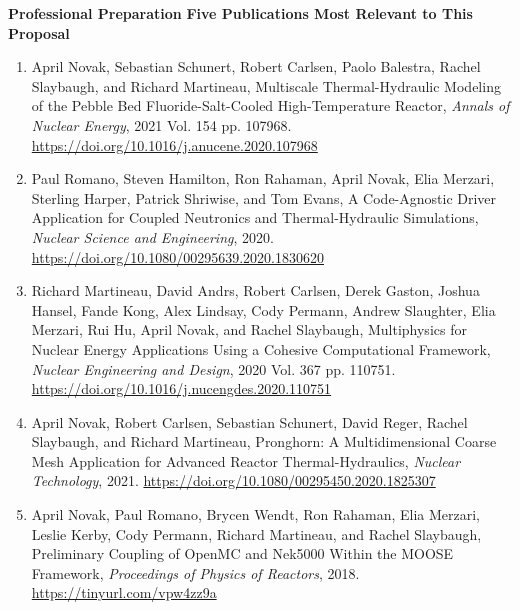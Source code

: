 \documentclass[11pt,letterpaper,english]{article}
\begin{document}
\begin{flushleft} {\bf Professional Preparation}
\vspace{.04in}
{\bf Five Publications Most Relevant to This Proposal}
\vspace{-6pt}
\begin{enumerate} \itemsep1pt \parskip0pt 
\item April Novak, Sebastian Schunert, Robert Carlsen, Paolo Balestra, Rachel Slaybaugh, and Richard Martineau, Multiscale Thermal-Hydraulic Modeling of the Pebble Bed Fluoride-Salt-Cooled High-Temperature Reactor, \textit{Annals of Nuclear Energy}, 2021 Vol. 154 pp. 107968. \url{https://doi.org/10.1016/j.anucene.2020.107968}
\item Paul Romano, Steven Hamilton, Ron Rahaman, April Novak, Elia Merzari, Sterling Harper, Patrick Shriwise, and Tom Evans, A Code-Agnostic Driver Application for Coupled Neutronics and Thermal-Hydraulic Simulations, \textit{Nuclear Science and Engineering}, 2020. \url{https://doi.org/10.1080/00295639.2020.1830620}
\item Richard Martineau, David Andrs, Robert Carlsen, Derek Gaston, Joshua Hansel, Fande Kong, Alex Lindsay, Cody Permann, Andrew Slaughter, Elia Merzari, Rui Hu, April Novak, and Rachel Slaybaugh, Multiphysics for Nuclear Energy Applications Using a Cohesive Computational Framework, \textit{Nuclear Engineering and Design}, 2020 Vol. 367 pp. 110751. \url{https://doi.org/10.1016/j.nucengdes.2020.110751}\\
\item April Novak, Robert Carlsen, Sebastian Schunert, David Reger, Rachel Slaybaugh, and Richard Martineau, Pronghorn: A Multidimensional Coarse Mesh Application for Advanced Reactor Thermal-Hydraulics, \textit{Nuclear Technology}, 2021. \url{https://doi.org/10.1080/00295450.2020.1825307}\\
\item April Novak, Paul Romano, Brycen Wendt, Ron Rahaman, Elia Merzari, Leslie Kerby, Cody Permann, Richard Martineau, and Rachel Slaybaugh, Preliminary Coupling of OpenMC and Nek5000 Within the MOOSE Framework, \textit{Proceedings of Physics of Reactors}, 2018. \url{https://tinyurl.com/vpw4zz9a}
\end{enumerate}


\end{flushleft}
\end{document}
